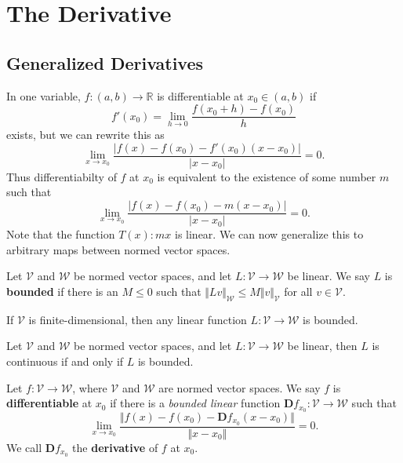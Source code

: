 \documentclass[twoside,10pt]{report}
\begin{document}

\chapter{The Derivative}


\section{Generalized Derivatives}

In one variable, $f:(a,b) \to \mathbb{R}$ is differentiable at $x_0 \in (a,b)$ if
\[
	f'(x_0) = \lim_{h \to 0} \frac{f(x_0+h) - f(x_0)}{h} 
\] exists, but we can rewrite this as
\[
	\lim_{x \to x_0} \frac{|f(x)-f(x_0) - f'(x_0)(x-x_0)|}{|x-x_0|} =0.
\] Thus differentiabilty of $f$ at $x_0$ is equivalent to the existence of some number $m$ such that
\[
	\lim_{x \to x_0} \frac{|f(x)-f(x_0) - m(x-x_0)|}{|x-x_0|} =0.
\] Note that the function $T(x) : mx$ is linear.  We can now generalize this to arbitrary maps between normed vector spaces.

\begin{defn}[]
Let $\mathcal{V}$ and $\mathcal{W}$ be normed vector spaces, and let $L:\mathcal{V}\to\mathcal{W}$ be linear. We say $L$ is \textbf{bounded} if there is an $M \leq 0$ such that $\Vert{L v}\Vert_\mathcal{W} \leq M \Vert{v}\Vert_\mathcal{V}$ for all $v \in \mathcal{V}$.
\end{defn}

\begin{prop}
	If $\mathcal{V}$ is finite-dimensional, then any linear function $L:\mathcal{V} \to \mathcal{W}$ is bounded.
\end{prop}

\begin{prop}
	Let $\mathcal{V}$ and $\mathcal{W}$ be normed vector spaces, and let $L:\mathcal{V}\to\mathcal{W}$ be linear, then $L$ is continuous if and only if $L$ is bounded.
\end{prop}

\begin{defn}[]
	Let $f: \mathcal{V} \to \mathcal{W}$, where $\mathcal{V}$ and $\mathcal{W}$ are normed vector spaces. We say $f$ is \textbf{differentiable} at $x_0$ if there is a \textit{bounded linear} function $\mathbf{D}f_{x_0}: \mathcal{V} \to \mathcal{W}$ such that
	\[
		\lim_{x \to x_0} \frac{\Vert{f(x) - f(x_0) - \mathbf{D}f_{x_0}(x-x_0)}\Vert}{\Vert{x-x_0}\Vert} =0.
	\] We call $\mathbf{D}f_{x_0}$ the \textbf{derivative} of $f$ at $x_0$.
\end{defn}
\end{document}
